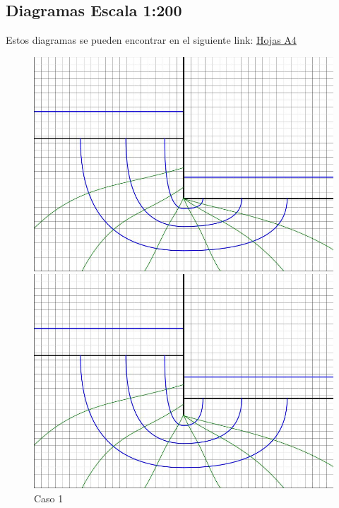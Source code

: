 \subsection{Diagramas Escala 1:200}
Estos diagramas se pueden encontrar en el siguiente link: \href{https://github.com/LukasWolff2002/ENTREGA_3_MCOC/tree/main/HOJAS_A4}{Hojas A4}
\begin{figure}[H]
    \centering
    \begin{minipage}{0.32\textwidth}
        \centering
        \includegraphics[width=\textwidth]{GRAFICOS/caso_1.jpg}
        \caption{Caso 1}
        \label{fig:caso_1}
    \end{minipage}
    \begin{minipage}{0.32\textwidth}
        \centering
        \includegraphics[width=\textwidth]{GRAFICOS/caso_2.jpg}

\end{minipage}
\end{figure}
